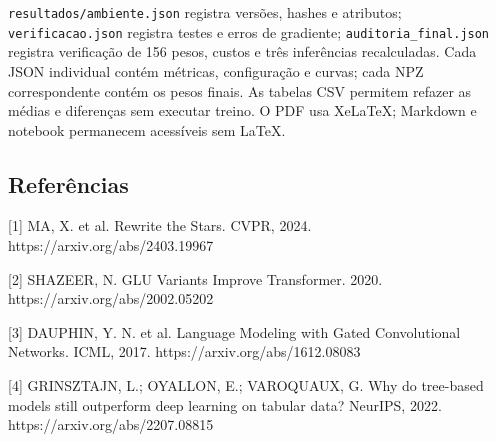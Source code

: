 \documentclass[10pt,a4paper]{article}
\begin{document}
\texttt{resultados/\allowbreak{}ambiente.json} registra versões, hashes e atributos; \texttt{verificacao.json} registra testes e erros de gradiente; \texttt{auditoria\_\allowbreak{}final.json} registra verificação de 156 pesos, custos e três inferências recalculadas. Cada JSON individual contém métricas, configuração e curvas; cada NPZ correspondente contém os pesos finais. As tabelas CSV permitem refazer as médias e diferenças sem executar treino. O PDF usa XeLaTeX; Markdown e notebook permanecem acessíveis sem LaTeX.


\subsection*{Referências}
[1] MA, X. et al. Rewrite the Stars. CVPR, 2024. https://arxiv.org/abs/2403.19967


[2] SHAZEER, N. GLU Variants Improve Transformer. 2020. https://arxiv.org/abs/2002.05202


[3] DAUPHIN, Y. N. et al. Language Modeling with Gated Convolutional Networks. ICML, 2017. https://arxiv.org/abs/1612.08083


[4] GRINSZTAJN, L.; OYALLON, E.; VAROQUAUX, G. Why do tree-based models still outperform deep learning on tabular data? NeurIPS, 2022. https://arxiv.org/abs/2207.08815
\end{document}
